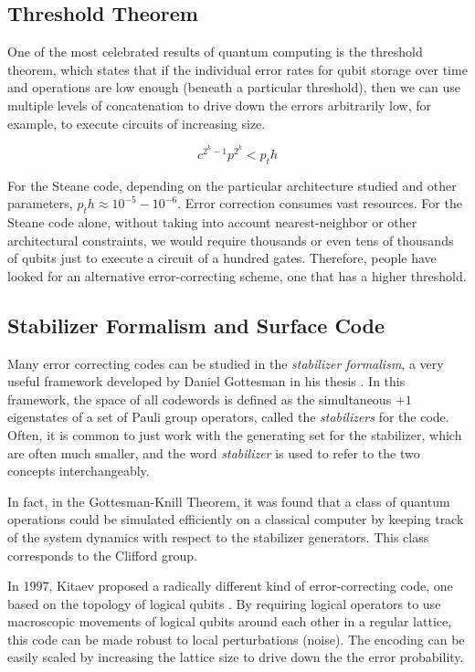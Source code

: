 \subsection{Threshold Theorem}

One of the most celebrated results of quantum computing is the threshold
theorem, which states that if the individual error rates for qubit storage
over time and operations are low enough (beneath a particular threshold),
then we can use multiple levels of concatenation to drive down the errors
arbitrarily low, for example, to execute circuits of increasing size.

\begin{displaymath}
c^{2^k-1}p^{2^k} < p_th
\end{displaymath}

For the Steane code, depending on the particular architecture studied and
other parameters, $p_th \approx 10^{-5} - 10^{-6}$.
Error correction consumes vast resources. For the Steane code alone, without
taking into account nearest-neighbor or other architectural constraints, we
would require thousands or even tens of thousands of qubits just to execute a
circuit of a hundred gates. Therefore, people have looked for an alternative
error-correcting scheme, one that has a higher threshold.

\subsection{Stabilizer Formalism and Surface Code}

Many error correcting codes can be studied in the \emph{stabilizer formalism},
a very useful framework developed by Daniel Gottesman in his thesis
\cite{Gottesman1997}. In this framework, the space of all codewords is
defined as the simultaneous $+1$ eigenstates of a set of Pauli group
operators, called the \emph{stabilizers} for the code. Often, it is common
to just work with the generating set for the stabilizer, which are often
much smaller, and the word \emph{stabilizer} is used to refer to the two
concepts interchangeably.

In fact, in the Gottesman-Knill Theorem, it was found that a class of quantum
operations could be simulated efficiently on a classical
computer by keeping track of the system dynamics with respect to the
stabilizer generators. This class corresponds to the Clifford group.

In 1997, Kitaev proposed a radically different kind of error-correcting code,
one based on the topology of logical qubits \cite{Fowler2009}.
By requiring logical operators to
use macroscopic movements of logical qubits around each other in a regular
lattice, this code can be made robust to local perturbations (noise). The
encoding can be easily scaled by increasing the lattice size to drive down the
the error probability.

